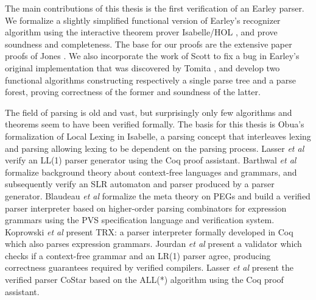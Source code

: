 \begin{isabellebody}
\begin{isamarkuptext}
The main contributions of this thesis is the first verification of an Earley parser. We formalize
a slightly simplified functional version of Earley's \cite{Earley:1970} recognizer algorithm
using the interactive theorem prover Isabelle/HOL \cite{Nipkow:2002}, and prove soundness and completeness.
The base for our proofs are the extensive paper proofs of Jones \cite{Jones:1972}. We also incorporate
the work of Scott \cite{Scott:2008} to fix a bug in Earley's original implementation that was discovered
by Tomita \cite{Tomita:1985}, and develop two functional algorithms constructing respectively a single parse
tree and a parse forest, proving correctness of the former and soundness of the latter.%
\end{isamarkuptext}\isamarkuptrue%
%
\isadelimdocument
%
\endisadelimdocument
%
\isatagdocument
%
\isamarkuptrue%
%
\endisatagdocument
{\isafolddocument}%
%
\isadelimdocument
%
\endisadelimdocument
%
\begin{isamarkuptext}%
The field of parsing is old and vast, but surprisingly only few algorithms and theorems seem to have been
verified formally. The basis for this thesis is Obua's formalization of Local Lexing \cite{Obua:2017} \cite{LocalLexing-AFP} in Isabelle,
a parsing concept that interleaves lexing and parsing allowing lexing to be dependent on the parsing process.
Lasser \textit{et al} \cite{Lasser:2019} verify an LL(1) parser generator using the Coq proof assistant.
Barthwal \textit{et al} \cite{Barthwal:2009} formalize background theory about context-free languages
and grammars, and subsequently verify an SLR automaton and parser produced by a parser generator.
Blaudeau \textit{et al} \cite{Blaudeau:2020} formalize the meta theory on PEGs and build a verified parser
interpreter based on higher-order parsing combinators for expression grammars using the PVS specification
language and verification system. Koprowski \textit{et al} \cite{Koprowski:2011} present TRX: a parser
interpreter formally developed in Coq which also parses expression grammars. Jourdan \textit{et al}
\cite{Jourdan:2012} present a validator which checks if a context-free grammar and an LR(1) parser
agree, producing correctness guarantees required by verified compilers. Lasser \textit{et al} \cite{Lasser:2021}
present the verified parser CoStar based on the ALL(*) algorithm using the Coq proof assistant.%
\end{isamarkuptext}\isamarkuptrue%
%
\isadelimdocument
%
\endisadelimdocument
%
\isatagdocument
%
\isamarkuptrue%

\end{isabellebody}
